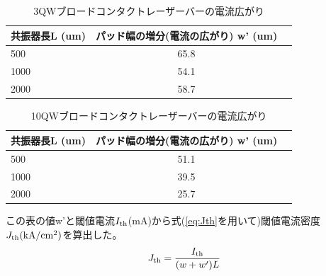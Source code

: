 \begin{table}[hbtp]
  \caption{3QWブロードコンタクトレーザーバーの電流広がり}
  \label{table_3QW_broadcontact_w_eff}
  \centering
  \begin{tabular}{lcr}
    \hline
    共振器長L (um)  & パッド幅の増分(電流の広がり) w' (um)   \\
    \hline \hline
     500 & 65.8  \\
    1000  & 54.1 \\
    2000  & 58.7 \\ 
    \hline
  \end{tabular}
\end{table}

\begin{table}[hbtp]
  \caption{10QWブロードコンタクトレーザーバーの電流広がり}
  \label{table_10QW_broadcontact_w_eff}
  \centering
  \begin{tabular}{lcr}
    \hline
    共振器長L (um)  & パッド幅の増分(電流の広がり) w' (um)   \\
    \hline \hline
     500 & 51.1  \\
    1000  & 39.5 \\
    2000  & 25.7 \\ 
    \hline
  \end{tabular}
\end{table}
この表の値w'と閾値電流$I_{\rm{th}}$(mA)から式(\ref{eq:Jth}を用いて)閾値電流密度$J_{\rm{th}} \rm{(kA/cm^2)}$を算出した。
\begin{eqnarray}
J_{\rm{th}}=\dfrac{I_{\rm{th}}}{(w+w')L}
\label{eq:Jth}
\end{eqnarray}


